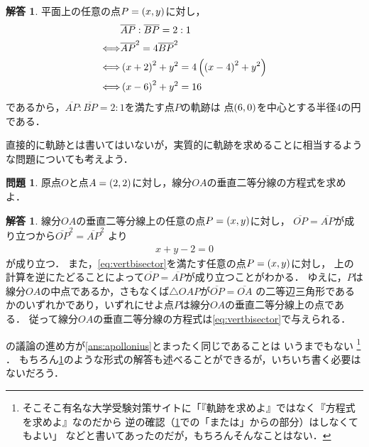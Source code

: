 \documentclass[11pt,a4paper]{ltjsarticle}
\newcommand*{\length}[1]{\overline{#1}}
\newcommand*{\equivalent}{\Longleftrightarrow}
\newcommand*{\coord}[1]{\paren{#1}}
\theoremstyle{definition}
\newtheorem{que}[dfn]{問題}
\newtheorem{ans}[dfn]{解答}
\begin{document}
\begin{ans} \label{ans:aplloniusomit}
  平面上の任意の点$P = \coord{x,y}$に対し，
  \begin{align*}
                & \length{AP} : \length{BP} = 2 : 1                       \\
    \equivalent & \length{AP}^2 = 4 \length{BP}^2                         \\
    \equivalent & \paren{x + 2}^2 + y^2 = 4 \paren{\paren{x - 4}^2 + y^2} \\
    \equivalent & \paren{x - 6}^2 + y^2 = 16
  \end{align*}
  であるから，$\length{AP} : \length{BP} = 2 : 1$を満たす点$P$の軌跡は
  点$\coord{6, 0}$を中心とする半径$4$の円である．
\end{ans}


直接的に軌跡とは書いてはいないが，実質的に軌跡を求めることに相当するような問題についても考えよう．

\begin{que} \label{que:vertbisector}
  原点$O$と点$A = \coord{2, 2}$に対し，線分$OA$の垂直二等分線の方程式を求めよ．
\end{que}

\begin{ans} \label{ans:vertbisector}
  線分$OA$の垂直二等分線上の任意の点$P = \coord{x, y}$に対し，
  $\length{OP} = \length{AP}$が成り立つから$\length{OP}^2 = \length{AP}^2$
  より
  \begin{align}
    x + y - 2 = 0
    \label{eq:vertbisector}
  \end{align}
  が成り立つ．
  また，\cref{eq:vertbisector}を満たす任意の点$P = \coord{x, y}$に対し，
  上の計算を逆にたどることによって$\length{OP} = \length{AP}$が成り立つことがわかる．
  ゆえに，$P$は線分$OA$の中点であるか，さもなくば$\triangle OAP$が$\length{OP} = \length{OA}$
  の二等辺三角形であるかのいずれかであり，いずれにせよ点$P$は線分$OA$の垂直二等分線上の点である．
  従って線分$OA$の垂直二等分線の方程式は\cref{eq:vertbisector}で与えられる．
\end{ans}

の議論の進め方が\cref{ans:apollonius}とまったく同じであることは
いうまでもない%
\footnote{%
  そこそこ有名な大学受験対策サイトに「『軌跡を求めよ』ではなく『方程式を求めよ』なのだから
  逆の確認（\cref{ans:vertbisector}での「または」からの部分）はしなくてもよい」
  などと書いてあったのだが，もちろんそんなことはない．
}%
．
もちろん\cref{ans:aplloniusomit}のような形式の解答も述べることができるが，いちいち書く必要はないだろう．
\end{document}
